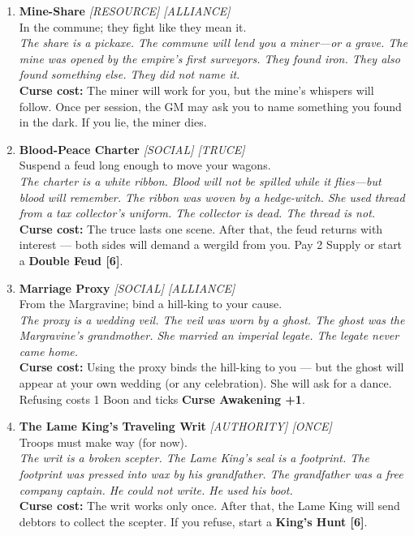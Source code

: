 \begin{enumerate}
\item \textbf{Mine-Share} \hfill {} \textit{[RESOURCE] [ALLIANCE]} \\
  In the commune; they fight like they mean it. \\
  \textit{The share is a pickaxe. The commune will lend you a miner---or a grave. The mine was opened by the empire's first surveyors. They found iron. They also found something else. They did not name it.} \\
  \textbf{Curse cost:} The miner will work for you, but the mine's whispers will follow. Once per session, the GM may ask you to name something you found in the dark. If you lie, the miner dies.

\item \textbf{Blood-Peace Charter} \hfill {} \textit{[SOCIAL] [TRUCE]} \\
  Suspend a feud long enough to move your wagons. \\
  \textit{The charter is a white ribbon. Blood will not be spilled while it flies---but blood will remember. The ribbon was woven by a hedge-witch. She used thread from a tax collector's uniform. The collector is dead. The thread is not.} \\
  \textbf{Curse cost:} The truce lasts one scene. After that, the feud returns with interest --- both sides will demand a wergild from you. Pay 2 Supply or start a \textbf{Double Feud [6]}.

\item \textbf{Marriage Proxy} \hfill {} \textit{[SOCIAL] [ALLIANCE]} \\
  From the Margravine; bind a hill-king to your cause. \\
  \textit{The proxy is a wedding veil. The veil was worn by a ghost. The ghost was the Margravine's grandmother. She married an imperial legate. The legate never came home.} \\
  \textbf{Curse cost:} Using the proxy binds the hill-king to you --- but the ghost will appear at your own wedding (or any celebration). She will ask for a dance. Refusing costs 1 Boon and ticks \textbf{Curse Awakening +1}.

\item \textbf{The Lame King's Traveling Writ} \hfill {} \textit{[AUTHORITY] [ONCE]} \\
  Troops must make way (for now). \\
  \textit{The writ is a broken scepter. The Lame King's seal is a footprint. The footprint was pressed into wax by his grandfather. The grandfather was a free company captain. He could not write. He used his boot.} \\
  \textbf{Curse cost:} The writ works only once. After that, the Lame King will send debtors to collect the scepter. If you refuse, start a \textbf{King's Hunt [6]}.


\end{enumerate}
